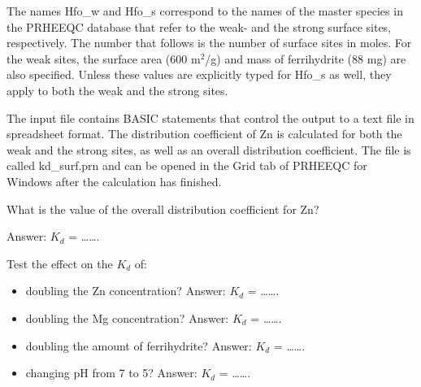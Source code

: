 The names {\color{red}Hfo\_w} and {\color{red}Hfo\_s} correspond to the names of the master species in the PRHEEQC database that refer to the weak- and the strong surface sites, respectively. The number that follows is the number of surface sites in moles. For the weak sites, the surface area (600 m$^2$/g) and mass of ferrihydrite (88 mg) are also specified. Unless these values are explicitly typed for Hfo\_s as well, they apply to both the weak and the strong sites.

The input file contains BASIC statements that control the output to a text file in spreadsheet format. The distribution coefficient of Zn is calculated for both the weak and the strong sites, as well as an overall distribution coefficient. The file is called {\color{red}kd\_surf.prn} and can be opened in the Grid tab of PRHEEQC for Windows after the calculation has finished.

What is the value of the overall distribution coefficient for Zn? 

Answer: $K_d$ = \ldots\ldots.

Test the effect on the $K_d$ of:

\begin{itemize}

\item doubling the Zn concentration? Answer: $K_d$ = \ldots\ldots.

\item doubling the Mg concentration? Answer: $K_d$ = \ldots\ldots.

\item doubling the amount of ferrihydrite? Answer: $K_d$ = \ldots\ldots.

\item changing pH from 7 to 5? Answer: $K_d$ = \ldots\ldots.

\end{itemize}